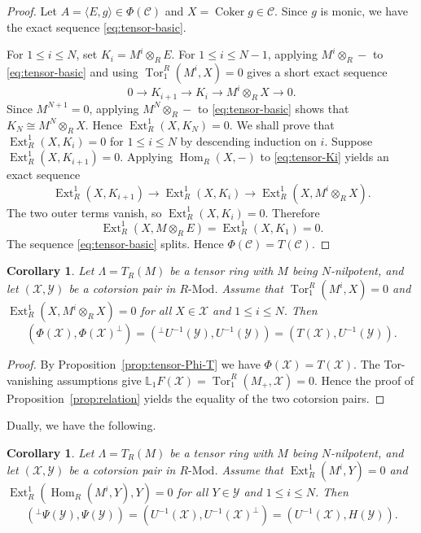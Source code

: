\documentclass[11pt,reqno]{amsart}
\numberwithin{equation}{section}
\newtheorem{corollary}[theorem]{Corollary}
\newcommand{\cX}{\mathcal X}
\newcommand{\cY}{\mathcal Y}
\newcommand{\cC}{\mathcal C}
\newcommand{\Ext}{\operatorname{Ext}}
\newcommand{\Hom}{\operatorname{Hom}}
\newcommand{\Tor}{\operatorname{Tor}}
\newcommand{\Coker}{\operatorname{Coker}}
\begin{document}
\begin{proof}
Let $A=\langle E,g\rangle\in\Phi(\cC)$ and $X=\Coker g\in\cC$. Since $g$ is monic, we have the exact sequence \eqref{eq:tensor-basic}.

For $1\le i\le N$, set
$
K_i=M^i\otimes_RE.
$
For $1\le i\le N-1$, applying $M^i\otimes_R-$ to \eqref{eq:tensor-basic} and using $\Tor_1^R(M^i,X)=0$ gives a short exact sequence
\begin{equation}\label{eq:tensor-Ki}
0\longrightarrow K_{i+1}\longrightarrow K_i
\longrightarrow M^i\otimes_RX\longrightarrow0.
\end{equation}
Since $M^{N+1}=0$, applying $M^N\otimes_R-$ to \eqref{eq:tensor-basic} shows that
$
K_N\cong M^N\otimes_RX.
$
Hence $\Ext_R^1(X,K_N)=0$. We shall prove that $\Ext_R^1(X,K_i)=0$ for $1\leq i\leq N$ by descending induction on $i$.
Suppose $\Ext_R^1(X,K_{i+1})=0$. Applying $\Hom_R(X,-)$ to \eqref{eq:tensor-Ki} yields an exact sequence
\[
\Ext_R^1(X,K_{i+1})\longrightarrow
\Ext_R^1(X,K_i)\longrightarrow
\Ext_R^1(X,M^i\otimes_RX).
\]
The two outer terms vanish, so $\Ext_R^1(X,K_i)=0$. Therefore
\[
\Ext_R^1(X,M\otimes_RE)=\Ext_R^1(X,K_1)=0.
\]
The sequence \eqref{eq:tensor-basic} splits. Hence $\Phi(\cC)=T(\cC).$
\end{proof}

\begin{corollary}\label{cor:tensor-coincidence}
Let $\Lambda = T_R(M)$ be a tensor ring with $M$ being $N$-nilpotent, and let $(\cX,\cY)$ be a cotorsion pair in $R\text{-Mod}$. Assume that
$
\Tor_1^R(M^i,X)=0
$
and
$
\Ext_R^1(X,M^i\otimes_RX)=0
$ for all $X\in\cX$ and $1\le i\le N$.
Then
\[
(\Phi(\cX),\Phi(\cX)^\perp)
=({}^\perp U^{-1}(\cY),U^{-1}(\cY))
=(T(\cX),U^{-1}(\cY)).
\]
\end{corollary}

\begin{proof}
By Proposition~\ref{prop:tensor-Phi-T} we have $\Phi(\cX)=T(\cX)$. The Tor-vanishing assumptions give
$
\mathbb{L}_1F(\cX)=\Tor_1^R(M_+,\cX)=0.
$
Hence the proof of Proposition~\ref{prop:relation} yields the equality of the two cotorsion pairs.
\end{proof}

Dually, we have the following.

\begin{corollary}\label{thm:tensor-cocoincidence}
Let $\Lambda = T_R(M)$ be a tensor ring with $M$ being $N$-nilpotent, and let $(\cX,\cY)$ be a cotorsion pair in $R\text{-Mod}$. Assume that
$
\Ext^1_R(M^i,Y)=0
$
and
$
\Ext_R^1(\Hom_R(M^i,Y),Y)=0
$ for all $Y\in\cY$ and $1\le i\le N$.
Then
\[
({}^\perp\Psi(\cY),\Psi(\cY))
=(U^{-1}(\cX),U^{-1}(\cX)^\perp)
=(U^{-1}(\cX),H(\cY)).
\]
\end{corollary}
\end{document}
